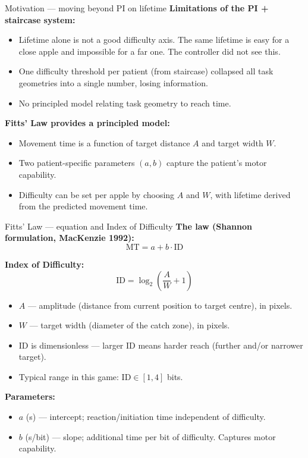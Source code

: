 \documentclass[10pt,aspectratio=169]{beamer}
\begin{document}
\begin{frame}{Motivation --- moving beyond PI on lifetime}
\textbf{Limitations of the PI + staircase system:}
\begin{itemize}
    \item Lifetime alone is not a good difficulty axis. The same lifetime is easy for a close apple and impossible for a far one. The controller did not see this.
    \item One difficulty threshold per patient (from staircase) collapsed all task geometries into a single number, losing information.
    \item No principled model relating task geometry to reach time.
\end{itemize}

\textbf{Fitts' Law provides a principled model:}
\begin{itemize}
    \item Movement time is a function of target distance $A$ and target width $W$.
    \item Two patient-specific parameters $(a, b)$ capture the patient's motor capability.
    \item Difficulty can be set per apple by choosing $A$ and $W$, with lifetime derived from the predicted movement time.
\end{itemize}
\end{frame}

\begin{frame}{Fitts' Law --- equation and Index of Difficulty}
\textbf{The law (Shannon formulation, MacKenzie 1992):}
\[
\boxed{\text{MT} = a + b \cdot \text{ID}}
\]

\textbf{Index of Difficulty:}
\[
\text{ID} = \log_2\!\left( \frac{A}{W} + 1 \right)
\]
\begin{itemize}
    \item $A$ --- amplitude (distance from current position to target centre), in pixels.
    \item $W$ --- target width (diameter of the catch zone), in pixels.
    \item ID is dimensionless --- larger ID means harder reach (further and/or narrower target).
    \item Typical range in this game: $\text{ID} \in [1, 4]$ bits.
\end{itemize}

\textbf{Parameters:}
\begin{itemize}
    \item $a$ (s) --- intercept; reaction/initiation time independent of difficulty.
    \item $b$ (s/bit) --- slope; additional time per bit of difficulty. Captures motor capability.
\end{itemize}
\end{frame}
\end{document}
